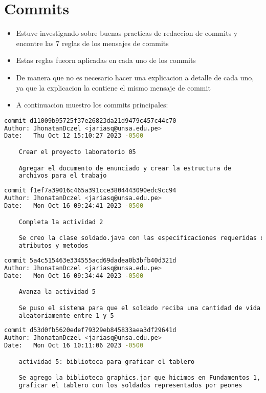 \section{Commits}
\begin{itemize}
    \item Estuve investigando sobre buenas practicas de redaccion de commits y encontre las 7 reglas de los mensajes de commits
    \item Estas reglas fueorn aplicadas en cada uno de los commits
    \item De manera que no es necesario hacer una explicacion a detalle de cada uno, ya que la explicacion la contiene el mismo mensaje de commit
    \item A continuacion muestro los commits principales:
\end{itemize}
      \begin{lstlisting}[language=bash, caption={Commits principales}]
commit d11009b95725f37e26823da21d9479c457c44c70
Author: JhonatanDczel <jariasq@unsa.edu.pe>
Date:   Thu Oct 12 15:10:27 2023 -0500

    Crear el proyecto laboratorio 05

    Agregar el documento de enunciado y crear la estructura de
    archivos para el trabajo
\end{lstlisting}
      \begin{lstlisting}[language=bash, caption={Commits principales}]
commit f1ef7a39016c465a391cce3804443090edc9cc94
Author: JhonatanDczel <jariasq@unsa.edu.pe>
Date:   Mon Oct 16 09:24:41 2023 -0500

    Completa la actividad 2

    Se creo la clase soldado.java con las especificaciones requeridas de
    atributos y metodos
\end{lstlisting}
      \begin{lstlisting}[language=bash, caption={Commits principales}]
commit 5a4c515463e334555acd69dadea0b3bfb40d321d
Author: JhonatanDczel <jariasq@unsa.edu.pe>
Date:   Mon Oct 16 09:34:44 2023 -0500

    Avanza la actividad 5

    Se puso el sistema para que el soldado reciba una cantidad de vida
    aleatoriamente entre 1 y 5
\end{lstlisting}
      \begin{lstlisting}[language=bash, caption={Commits principales}]
commit d53d0fb5620edef79329eb845833aea3df29641d
Author: JhonatanDczel <jariasq@unsa.edu.pe>
Date:   Mon Oct 16 10:11:06 2023 -0500

    actividad 5: biblioteca para graficar el tablero

    Se agrego la biblioteca graphics.jar que hicimos en Fundamentos 1, para
    graficar el tablero con los soldados representados por peones
\end{lstlisting}

